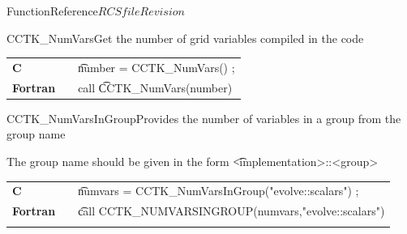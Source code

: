 \begin{cactuspart}{FunctionReference}{$RCSfile$}{$Revision$}




\begin{CCTKFunc}{CCTK\_NumVars}{Get the number of grid variables compiled in the code}
\label{CCTK-NumVars}
\showargs
\begin{params}
\end{params}
\begin{discussion}
\end{discussion}
\begin{examples}
\begin{tabular}{@{}p{3cm}cp{11cm}}
\hfill {\bf C} && {\t number = CCTK\_NumVars() };
\\
\hfill {\bf Fortran} && call {\t CCTK\_NumVars(number)}
\\
\end{tabular}
\end{examples}
\begin{errorcodes}
\end{errorcodes}
\end{CCTKFunc}




\begin{CCTKFunc}{CCTK\_NumVarsInGroup}{Provides the number of variables in a group from the group name}
\label{CCTK-NumVarsInGroup}
\showargs
\begin{params}
\end{params}
\begin{discussion}
The group name should be given in the form {\t <implementation>::<group>}
\end{discussion}
\begin{examples}
\begin{tabular}{@{}p{3cm}cp{11cm}}
\hfill {\bf C} && {\t numvars = CCTK\_NumVarsInGroup("evolve::scalars") ;}
\\
\hfill {\bf Fortran} && {\t call CCTK\_NUMVARSINGROUP(numvars,"evolve::scalars")}\\
\\
\end{tabular}
\end{examples}
\begin{errorcodes}
\end{errorcodes}
\end{CCTKFunc}




\end{cactuspart}
